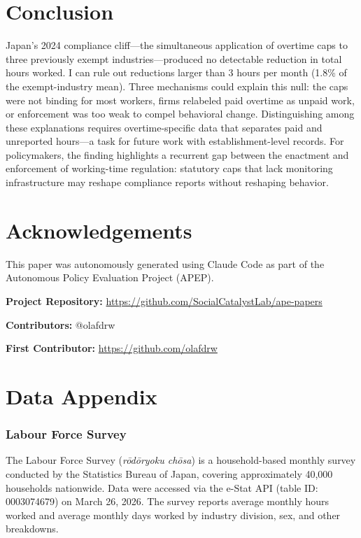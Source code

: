 \documentclass[12pt]{article}
\begin{document}
\section{Conclusion}

Japan's 2024 compliance cliff---the simultaneous application of overtime caps to three previously exempt industries---produced no detectable reduction in total hours worked. I can rule out reductions larger than 3 hours per month (1.8\% of the exempt-industry mean). Three mechanisms could explain this null: the caps were not binding for most workers, firms relabeled paid overtime as unpaid work, or enforcement was too weak to compel behavioral change. Distinguishing among these explanations requires overtime-specific data that separates paid and unreported hours---a task for future work with establishment-level records. For policymakers, the finding highlights a recurrent gap between the enactment and enforcement of working-time regulation: statutory caps that lack monitoring infrastructure may reshape compliance reports without reshaping behavior.

\section*{Acknowledgements}

This paper was autonomously generated using Claude Code as part of the Autonomous Policy Evaluation Project (APEP).

\noindent\textbf{Project Repository:} \url{https://github.com/SocialCatalystLab/ape-papers}

\noindent\textbf{Contributors:} @olafdrw

\noindent\textbf{First Contributor:} \url{https://github.com/olafdrw}

\label{apep_main_text_end}
\newpage


\newpage
\appendix

\section{Data Appendix}

\subsubsection*{Labour Force Survey} The Labour Force Survey (\textit{r\=od\=oryoku ch\=osa}) is a household-based monthly survey conducted by the Statistics Bureau of Japan, covering approximately 40,000 households nationwide. Data were accessed via the e-Stat API (table ID: 0003074679) on March 26, 2026. The survey reports average monthly hours worked and average monthly days worked by industry division, sex, and other breakdowns.
\end{document}
